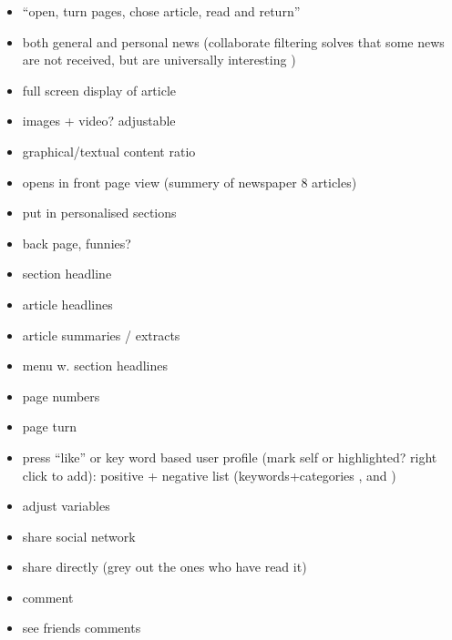 \begin{itemize}
	\item ``open, turn pages, chose article, read and return'' \cite[p. 6]{FULLTEXT01.pdf}
	\item both general and personal news (collaborate filtering solves that some news are not received, but are universally interesting \cite{fulltext.pdf})
	\item full screen display of article
	\item images + video? adjustable
	\item graphical/textual content ratio
	\item opens in front page view (summery of newspaper 8 articles) \cite[p. 8]{kristin_fredrik.pdf}
	\item put in personalised sections
	\item back page, funnies?
	\item section headline \cite[p. 6-7]{kristin_fredrik.pdf}
	\item article headlines
	\item article summaries / extracts \cite{fulltext.pdf}
	\item menu w. section headlines \cite[p. 8]{kristin_fredrik.pdf}
	\item page numbers \cite[p. 6-7]{kristin_fredrik.pdf}
	\item page turn
	\item press ``like'' or key word based user profile (mark self or highlighted? right click to add): positive + negative list (keywords+categories \cite{10-1-1-19-5583}, \cite{fulltext.pdf} and \cite{gervasum2001ws.pdf})
	\item adjust variables
	\item share social network
	\item share directly (grey out the ones who have read it)
	\item comment
	\item see friends comments
\end{itemize}

